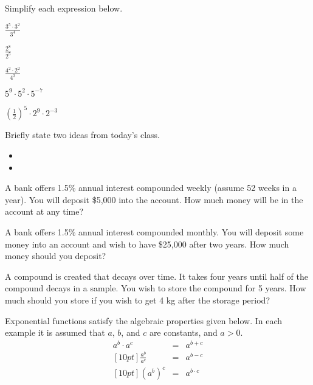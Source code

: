 \begin{problem}
  \vfill

  \clearpage

\item Simplify each expression below.
  \begin{subproblem}
  \item $\frac{3^5\cdot 3^2}{3^4}$
    \vfill
  \item $\frac{2^8}{2^5}$
    \vfill
  \item $\frac{4^2\cdot 2^2}{4^3}$
    \vfill
  \item $5^9\cdot 5^2\cdot 5^{-7}$
    \vfill
  \item $\left(\frac{1}{2}\right)^5 \cdot 2^9 \cdot 2^{-3}$
    \vfill
  \end{subproblem}

\end{problem}

\postClass

\begin{problem}
\item Briefly state two ideas from today's class.
  \begin{itemize}
  \item 
  \item 
  \end{itemize}
\item A bank offers 1.5\% annual interest compounded weekly (assume 52
  weeks in a year). You will deposit \$5,000 into the account. How
  much money will be in the account at any time?
\item A bank offers 1.5\% annual interest compounded monthly. You will
  deposit some money into an account and wish to have \$25,000 after
  two years. How much money should you deposit?
\item A compound is created that decays over time. It takes four years
  until half of the compound decays in a sample. You wish to store the
  compound for 5 years. How much should you store if you wish to get 4
  kg after the storage period?
\end{problem}



Exponential functions satisfy the algebraic properties given below. In
each example it is assumed that $a$, $b$, and $c$ are constants, and
$a>0$. 
\begin{eqnarray}
  a^b \cdot a^c & = & a^{b+c}   \\ [10pt]
  \frac{a^b}{a^c} & = & a^{b-c} \\  [10pt]
  \left( a^b \right)^c & = & a^{b\cdot c}
\end{eqnarray}

